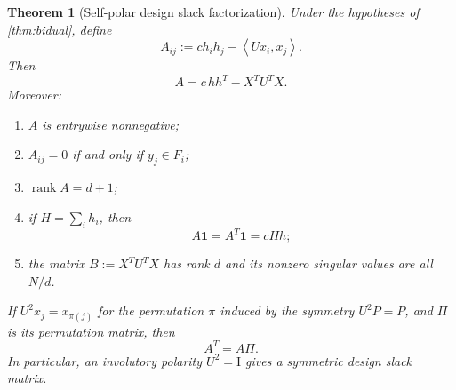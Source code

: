 \documentclass[11pt]{amsart}
\newtheorem{theorem}{Theorem}[section]
\theoremstyle{definition}
\theoremstyle{remark}
\newcommand{\Id}{\mathrm I}
\newcommand{\rank}{\operatorname{rank}}
\newcommand{\ip}[2]{\left\langle #1,#2\right\rangle}
\begin{document}
\begin{theorem}[Self-polar design slack factorization]\label{thm:slack}
Under the hypotheses of \cref{thm:bidual}, define
\begin{equation}\label{eq:Adef}
 A_{ij}:=c h_i h_j-\ip{Ux_i}{x_j}.
\end{equation}
Then
\begin{equation}\label{eq:Amatrix}
 \boxed{A=c\,hh^T-X^TU^TX.}
\end{equation}
Moreover:
\begin{enumerate}[label=\textup{(\roman*)}]
\item $A$ is entrywise nonnegative;
\item $A_{ij}=0$ if and only if $y_j\in F_i$;
\item $\rank A=d+1$;
\item if $H=\sum_i h_i$, then
\begin{equation}\label{eq:rowsums}
 A\mathbf1=A^T\mathbf1=cHh;
\end{equation}
\item the matrix $B:=X^TU^TX$ has rank $d$ and its nonzero singular values are all $N/d$.
\end{enumerate}
If $U^2x_j=x_{\pi(j)}$ for the permutation $\pi$ induced by the symmetry $U^2P=P$, and $\Pi$ is its permutation matrix, then
\begin{equation}\label{eq:twistsym}
 A^T=A\Pi.
\end{equation}
In particular, an involutory polarity $U^2=\Id$ gives a symmetric design slack matrix.
\end{theorem}
\end{document}
